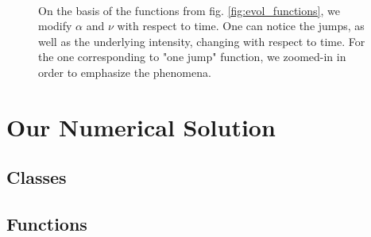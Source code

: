 \begin{figure}
\centering
{} 
\\

\caption{On the basis of the functions from fig. \ref{fig:evol_functions}, we modify $\alpha$ and $\nu$ with respect to time. One can notice the jumps, as well as the underlying intensity, changing with respect to time. For the one corresponding to "one jump" function, we zoomed-in in order to emphasize the phenomena.}
\label{fig:param_dep_hawkes}
\end{figure}











\section{Our Numerical Solution}

\subsection{Classes}
\subsection{Functions}

